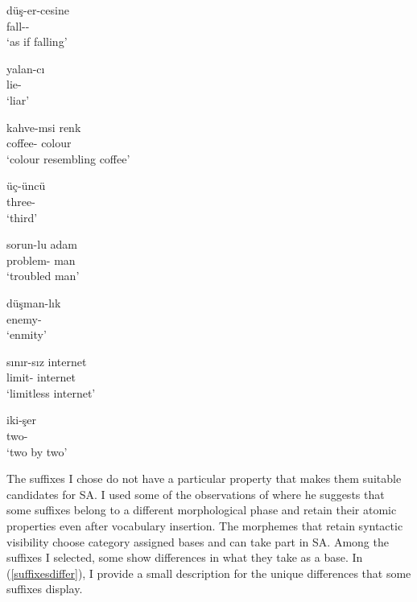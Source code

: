 \begin{exe}
  \begin{multicols}{2}
    \ex \label{derivationalsuffixes}
    \begin{xlist}
        \ex \gll düş-er-cesine \\ 
        fall-{\Aor}-{\Der} \\
        \glt `as if falling'
        
        \ex \gll yalan-cı \\ 
        lie-{\Der} \\ 
        \glt `liar'
        
        \ex \gll kahve-msi renk \\ 
        coffee-{\Der} colour \\
        \glt `colour resembling coffee'

        \ex \gll üç-üncü \\ 
        three-{\Der} \\
        \glt `third'

        \ex \gll sorun-lu adam \\ 
        problem-{\Der} man \\
        \glt `troubled man'
        
        \ex \gll düşman-lık \\ 
        enemy-{\Der} \\
        \glt `enmity'
        
        \ex \gll sınır-sız internet \\ 
        limit-{\Der} internet \\
        \glt `limitless internet'
        
        \ex \gll iki-şer \\ two-{\Der} \\
        \glt `two by two'
    \end{xlist}
    \end{multicols}
\end{exe}

The suffixes I chose do not have a particular property that makes them suitable candidates for SA. I used some of the observations of \citet{yoon2017lexical} where he suggests that some suffixes belong to a different morphological phase and retain their atomic properties even after vocabulary insertion. The morphemes that retain syntactic visibility choose category assigned bases and can take part in SA. Among the suffixes I selected, some show differences in what they take as a base. In (\ref{suffixesdiffer}), I provide a small description for the unique differences that some suffixes display.

